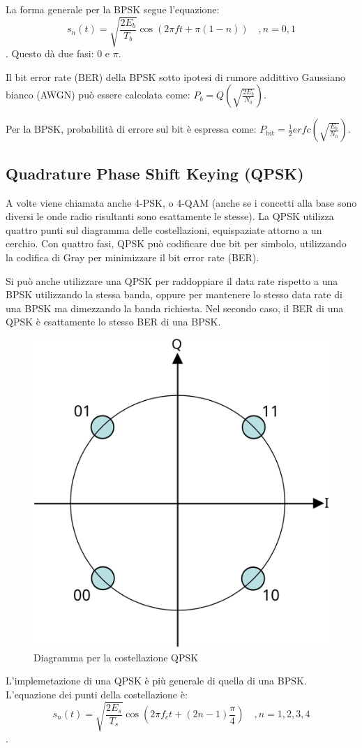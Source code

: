 La forma generale per la \ac{BPSK} segue l'equazione: $$s_n(t) = \sqrt{\frac{2E_b}{T_b}} \cos(2\pi f t + \pi(1-n)) \quad , n = 0,1 $$.
Questo dà due fasi: 0 e $\pi$.

Il bit error rate (\ac{BER}) della \ac{BPSK} sotto ipotesi di rumore addittivo Gaussiano bianco (\ac{AWGN}) può essere calcolata come: $P_b = Q(\sqrt{\frac{2 E_b}{N_0}})$.

Per la \ac{BPSK}, probabilità di errore sul bit è espressa come: $P_{\text{bit}} = \frac{1}{2} erfc(\sqrt{\frac{E_b}{N_0}})$.

\subsection{Quadrature Phase Shift Keying (QPSK)}
A volte viene chiamata anche 4-\ac{PSK}, o 4-\ac{QAM} (anche se i concetti alla base sono diversi le onde radio risultanti sono esattamente le stesse).
La \ac{QPSK} utilizza quattro punti sul diagramma delle costellazioni, equispaziate attorno a un cerchio.
Con quattro fasi, \ac{QPSK} può codificare due bit per simbolo, utilizzando la codifica di Gray per minimizzare il bit error rate (\ac{BER}).

Si può anche utilizzare una \ac{QPSK} per raddoppiare il data rate rispetto a una \ac{BPSK} utilizzando la stessa banda, oppure per mantenere lo stesso data rate di una \ac{BPSK} ma dimezzando la banda richiesta.
Nel secondo caso, il \ac{BER} di una \ac{QPSK} è esattamente lo stesso \ac{BER} di una \ac{BPSK}.

\begin{figure}[htbp]
  \centering
  \includegraphics[width=0.4\linewidth]{./res/img/qpsk_diagram.png}
  \caption{Diagramma per la costellazione QPSK}
  \label{fig:qpsk-diagram}
\end{figure}

L'implemetazione di una \ac{QPSK} è più generale di quella di una \ac{BPSK}.
L'equazione dei punti della costellazione è: $$s_n(t) = \sqrt{\frac{2 E_s}{T_s}} \cos(2 \pi f_c t + (2n - 1)\frac{\pi}{4}) \quad , n=1,2,3,4$$.

